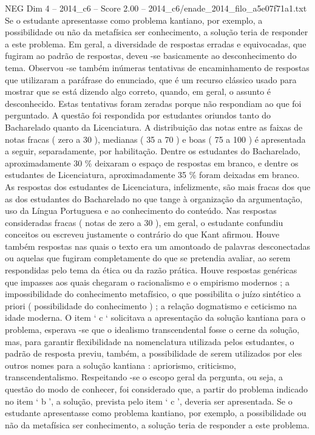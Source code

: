 \begin{textsample}{NEG Dim 4 – 2014\_c6 – Score 2.00 – 2014\_c6/enade\_2014\_filo\_a5e07f71a1.txt}
Se o estudante apresentasse como problema kantiano, por exemplo, a possibilidade ou não da metafísica ser conhecimento, a solução teria de responder a este problema.
Em geral, a diversidade de respostas erradas e equivocadas, que fugiram ao padrão de respostas, deveu -se basicamente ao desconhecimento do tema.
Observou -se também inúmeras tentativas de encaminhamento de respostas que utilizaram a paráfrase do enunciado, que é um recurso clássico usado para mostrar que se está dizendo algo correto, quando, em geral, o assunto é desconhecido.
Estas tentativas foram zeradas porque não respondiam ao que foi perguntado.
A questão foi respondida por estudantes oriundos tanto do Bacharelado quanto da Licenciatura.
A distribuição das notas entre as faixas de notas fracas ( zero a 30 ), medianas ( 35 a 70 ) e boas ( 75 a 100 ) é apresentada a seguir, separadamente, por habilitação.
Dentre os estudantes do Bacharelado, aproximadamente 30 \% deixaram o espaço de respostas em branco, e dentre os estudantes de Licenciatura, aproximadamente 35 \% foram deixadas em branco.
As respostas dos estudantes de Licenciatura, infelizmente, são mais fracas dos que as dos estudantes do Bacharelado no que tange à organização da argumentação, uso da Língua Portuguesa e ao conhecimento do conteúdo.
Nas respostas consideradas fracas ( notas de zero a 30 ), em geral, o estudante confundiu conceitos ou escreveu justamente o contrário do que Kant afirmou.
Houve também respostas nas quais o texto era um amontoado de palavras desconectadas ou aquelas que fugiram completamente do que se pretendia avaliar, ao serem respondidas pelo tema da ética ou da razão prática.
Houve respostas genéricas que impasses aos quais chegaram o racionalismo e o empirismo modernos ; a impossibilidade do conhecimento metafísico, o que possibilita o juízo sintético a priori ( possibilidade do conhecimento ) ; a relação dogmatismo e ceticismo na idade moderna.
O item ‘ c ‘ solicitava a apresentação da solução kantiana para o problema, esperava -se que o idealismo transcendental fosse o cerne da solução, mas, para garantir flexibilidade na nomenclatura utilizada pelos estudantes, o padrão de resposta previu, também, a possibilidade de serem utilizados por eles outros nomes para a solução kantiana : apriorismo, criticismo, transcendentalismo.
Respeitando -se o escopo geral da pergunta, ou seja, a questão do modo de conhecer, foi considerado que, a partir do problema indicado no item ‘ b ’, a solução, prevista pelo item ‘ c ’, deveria ser apresentada.
Se o estudante apresentasse como problema kantiano, por exemplo, a possibilidade ou não da metafísica ser conhecimento, a solução teria de responder a este problema.

\end{textsample}
